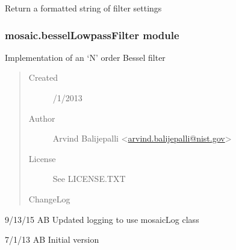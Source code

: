 \documentclass[letterpaper,10pt,english]{sphinxmanual}
\begin{document}
\begin{fulllineitems}
\begin{fulllineitems}
\end{fulllineitems}


\begin{fulllineitems}
\label{api-doc/mosaic.filter:mosaic.waveletDenoiseFilter.waveletDenoiseFilter.formatsettings}
Return a formatted string of filter settings

\end{fulllineitems}


\end{fulllineitems}



\subsubsection{mosaic.besselLowpassFilter module}
\label{api-doc/mosaic.filter:mosaic-bessellowpassfilter-module}\label{api-doc/mosaic.filter:module-mosaic.besselLowpassFilter}
Implementation of an `N' order Bessel filter
\begin{quote}\begin{description}
\item[{Created}] /1/2013

\item[{Author}] \leavevmode
Arvind Balijepalli \textless{}\href{mailto:arvind.balijepalli@nist.gov}{arvind.balijepalli@nist.gov}\textgreater{}

\item[{License}] \leavevmode
See LICENSE.TXT

\item[{ChangeLog}] \leavevmode
\end{description}\end{quote}

\begin{DUlineblock}{0em}
\item[] 9/13/15         AB      Updated logging to use mosaicLog class
\item[] 7/1/13          AB      Initial version
\end{DUlineblock}
\end{document}
